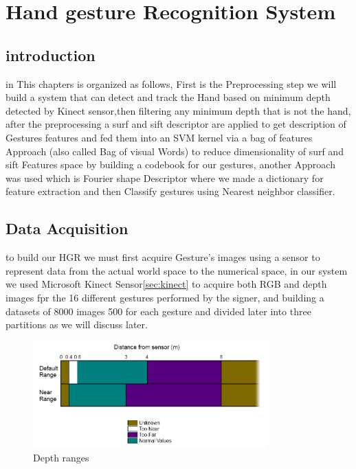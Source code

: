 
\chapter{Hand gesture Recognition System} \label{hgr}

\section{introduction}

in This chapters is organized as follows, First is the Preprocessing step we will build a system that can detect and track the Hand based on minimum depth detected by Kinect sensor,then filtering any minimum depth that is not the hand, after the preprocessing  a surf and sift descriptor are applied to get description of Gestures features  and fed them into an SVM kernel via a bag of features  Approach  (also called Bag of visual Words) to reduce dimensionality of surf and sift Features space by building a codebook for our gestures, another Approach was used which is Fourier shape Descriptor where we made a dictionary for feature extraction and then Classify gestures using Nearest neighbor classifier.

\section{Data Acquisition}

to build our HGR we must first acquire Gesture's images  using a sensor to represent data from the actual world space  to the numerical space, in our system we used Microsoft Kinect Sensor\ref{sec:kinect}  to acquire both RGB and depth images fpr the  16 different gestures performed by the signer, and building a datasets of 8000 images 500  for each gesture and divided later into three partitions as we will discuss later. 



\begin{figure}[H]
\centering
\includegraphics[width=0.8\textwidth]{img/dist.png}
\caption{Depth ranges}
\label{fig:dist}
\end{figure}



